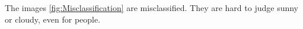 The images \ref{fig:Misclassification} are misclassified. They are hard to judge sunny or cloudy, even for people.
\graphicspath{ {./Figures/} }
\begin{figure}[htb]
    \centering
\end{figure}

